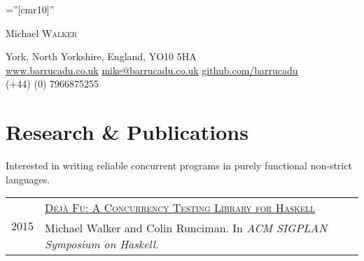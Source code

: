 \documentclass[a4paper,10pt]{article}
\newcommand{\schref}[2]{\href{#1}{\textsc{#2}}}
\newcommand{\mhref}[1]{\href{mailto:#1}{#1}}
\newcommand{\hhref}[1]{\href{http://#1}{#1}}
\newenvironment{cvtable}{\begin{tabular}{x{2cm}|p{11.6cm}}}{\end{tabular}}
\newcommand{\when}[1]{\multirow{2}{2cm}{\raggedleft \textsc{#1}} &}
\newcommand{\detail}[1]{ & \footnotesize{#1}}
\begin{document}
\pagestyle{empty} %

\font\fb=''[cmr10]'' %

\par{\centering
		{\Huge Michael \textsc{Walker}
	}\bigskip\par}

{\centering
York, North Yorkshire, England, YO10 5HA\\
\hhref{www.barrucadu.co.uk} \mhref{mike@barrucadu.co.uk} \hhref{github.com/barrucadu} \\
(+44) (0) 7966875255\\
}

\section{Research \& Publications}
Interested in writing reliable concurrent programs in purely
functional non-strict languages.

\begin{cvtable}
  \when{2015} \schref{https://dl.acm.org/citation.cfm?doid=2804302.2804306}{Déjà Fu: A Concurrency Testing Library for Haskell}\\
  \detail{Michael Walker and Colin Runciman. In \textit{ACM SIGPLAN Symposium on Haskell}.}
\end{cvtable}
\end{document}
